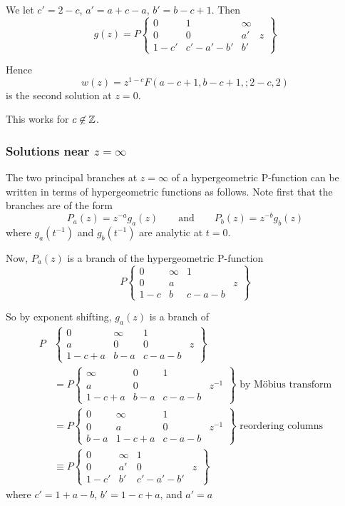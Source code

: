 \documentclass[a4paper]{article}
\begin{document}
We let $c' = 2-c$, $a' = a +c - a$,  $b' = b-c+1$. Then
\[
	g(z) = P \begin{Bmatrix} 0 & 1 & \infty & \\
                0 & 0 & a' & z \\
                1-c' & c'-a'-b' & b' & 
        \end{Bmatrix}
\] 

Hence 
 \[
	 w(z) = z^{1-c} F(a-c+1, b-c+1,; 2-c, 2)
\] is the second solution at $z=0$.

\begin{note}
	This works for $c \not\in \mathbb{Z}$.
\end{note}

\subsubsection{Solutions near $z=\infty$ }

The two principal branches at $z=\infty$ of a hypergeometric P-function can be written in terms of hypergeometric functions as follows. Note first that the branches are of the form
\[
	P_a(z) = z^{-a} g_a(z) \qquad \text{and} \qquad P_b(z) = z^{-b} g_b(z)
\] where $g_a(t^{-1})$ and $g_b(t^{-1})$ are analytic at $t=0$.

Now, $P_a(z)$ is a branch of the hypergeometric P-function
\[
P\begin{Bmatrix} 0 & \infty & 1 & \\
                0 & a &  & z \\
                1-c & b & c-a-b & 
        \end{Bmatrix}
\] 

So by exponent shifting, $g_a(z)$ is a branch of
\begin{align*}
	P&\begin{Bmatrix} 0 & \infty & 1 & \\
                a & 0 & 0 & z \\
                1-c+a & b-a & c-a-b & 
        \end{Bmatrix} \\
	&= P \begin{Bmatrix} \infty & 0 & 1 & \\
                a & 0 &  & z^{-1} \\
                1-c+a & b-a & c-a-b & 
	\end{Bmatrix} \text{ by M\"{o}bius transform}\\
	&= P \begin{Bmatrix} 0 & \infty & 1 & \\
                0 & a & 0 & z^{-1} \\
                b-a & 1-c+a & c-a-b & 
        \end{Bmatrix} \text{ reordering columns}\\
	&\equiv P\begin{Bmatrix} 0 & \infty & 1 & \\
                0 & a' & 0 & z \\
                1-c' & b' & c'-a'-b' & 
        \end{Bmatrix}
\end{align*} where $c' = 1+a-b$,  $b' = 1-c+a$, and  $a' = a$
\end{document}
